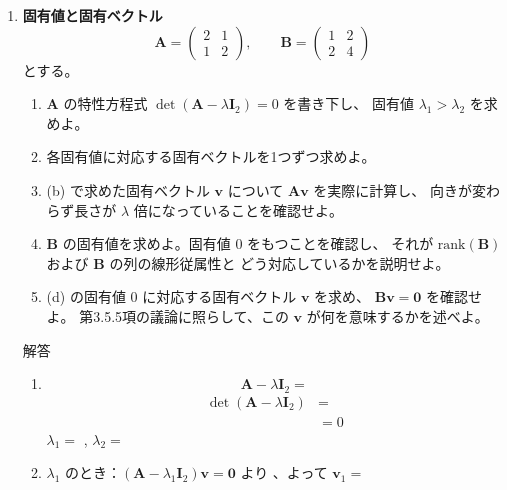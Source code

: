 \documentclass[a4paper,dvipdfmx]{jsarticle}
\newcommand{\提出期限}{2026年10月12日（月）}
\newcommand{\学籍番号}{0000000}
\newcommand{\氏名}{氏名を書く}
\newcommand{\提出日}{2026年10月12日}
\newenvironment{answer}{\begin{itembox}[l]{解答}}{\end{itembox}}
\begin{document}
\begin{enumerate}
  \item \textbf{固有値と固有ベクトル}\quad
    \begin{equation*}
      \bm{A} = \begin{pmatrix} 2 & 1 \\ 1 & 2 \end{pmatrix},
      \qquad
      \bm{B} = \begin{pmatrix} 1 & 2 \\ 2 & 4 \end{pmatrix}
    \end{equation*}
    とする。
    \begin{enumerate}
      \item $\bm{A}$ の特性方程式 $\det(\bm{A} - \lambda\bm{I}_2) = 0$ を書き下し、
        固有値 $\lambda_1 > \lambda_2$ を求めよ。
      \item 各固有値に対応する固有ベクトルを1つずつ求めよ。
      \item (b) で求めた固有ベクトル $\bm{v}$ について $\bm{A}\bm{v}$ を実際に計算し、
        向きが変わらず長さが $\lambda$ 倍になっていることを確認せよ。
      \item $\bm{B}$ の固有値を求めよ。固有値 $0$ をもつことを確認し、
        それが $\mathrm{rank}(\bm{B})$ および $\bm{B}$ の列の線形従属性と
        どう対応しているかを説明せよ。
      \item (d) の固有値 $0$ に対応する固有ベクトル $\bm{v}$ を求め、
        $\bm{B}\bm{v} = \bm{0}$ を確認せよ。
        第3.5.5項の議論に照らして、この $\bm{v}$ が何を意味するかを述べよ。
    \end{enumerate}
    \begin{answer}
      \begin{enumerate}
        \item
          \begin{equation*}
            \bm{A} - \lambda\bm{I}_2 =
          \end{equation*}
          \begin{align*}
            \det(\bm{A} - \lambda\bm{I}_2) &= \\
                                           &= 0
          \end{align*}
          $\lambda_1 = $ \phantom{XXX}, \quad $\lambda_2 = $ \phantom{XXX}
        \item $\lambda_1$ のとき：$(\bm{A} - \lambda_1\bm{I}_2)\bm{v} = \bm{0}$ より
          \phantom{XXXXXXXXXX}、よって $\bm{v}_1 = $ \phantom{XXXXXX} \\[2mm]

\end{enumerate}
\end{answer}
\end{enumerate}
\end{document}
